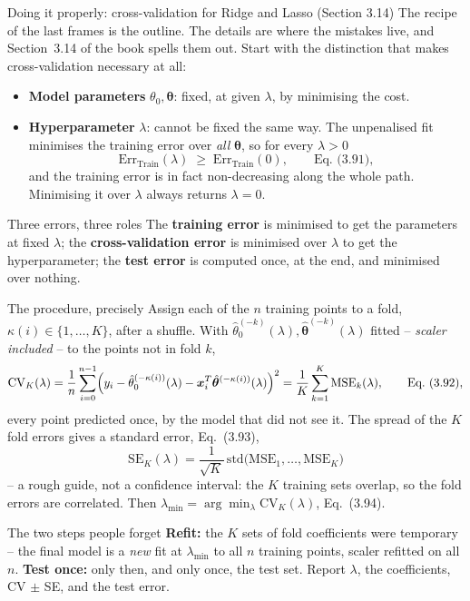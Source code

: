 \documentclass[10pt,aspectratio=169]{beamer}
\begin{document}
\begin{frame}{Doing it properly: cross-validation for Ridge and Lasso (Section 3.14)}
The recipe of the last frames is the outline.  The details are where the
mistakes live, and Section~3.14 of the book spells them out.  Start with the
distinction that makes cross-validation necessary at all:
\begin{itemize}
  \item \textbf{Model parameters} $\theta_0,\bm{\theta}$: fixed, at given
        $\lambda$, by minimising the cost.
  \item \textbf{Hyperparameter} $\lambda$: cannot be fixed the same way.  The
        unpenalised fit minimises the training error over \emph{all}
        $\bm{\theta}$, so for every $\lambda>0$
        \[
          \mathrm{Err}_{\mathrm{Train}}(\lambda)\;\ge\;\mathrm{Err}_{\mathrm{Train}}(0),
          \qquad\text{Eq.~(3.91)},
        \]
        and the training error is in fact non-decreasing along the whole
        path.  Minimising it over $\lambda$ always returns $\lambda=0$.
\end{itemize}
\vspace{2pt}
\begin{block}{Three errors, three roles}
The \textbf{training error} is minimised to get the parameters at fixed
$\lambda$; the \textbf{cross-validation error} is minimised over $\lambda$
to get the hyperparameter; the \textbf{test error} is computed once, at the
end, and minimised over nothing.
\end{block}
\end{frame}

\begin{frame}{The procedure, precisely}
Assign each of the $n$ training points to a fold, $\kappa(i)\in\{1,\dots,K\}$,
after a shuffle.  With $\hat{\theta}_0^{(-k)}(\lambda),\hat{\bm{\theta}}^{(-k)}(\lambda)$
fitted -- \emph{scaler included} -- to the points not in fold $k$,
\[
  \mathrm{CV}_K(\lambda)
   = \frac{1}{n}\sum_{i=0}^{n-1}
     \Bigl(y_i-\hat{\theta}_0^{(-\kappa(i))}(\lambda)
       -\bm{x}_i^T\hat{\bm{\theta}}^{(-\kappa(i))}(\lambda)\Bigr)^2
   = \frac{1}{K}\sum_{k=1}^{K}\mathrm{MSE}_k(\lambda),
  \qquad\text{Eq.~(3.92)},
\]
every point predicted once, by the model that did not see it.  The spread of
the $K$ fold errors gives a standard error, Eq.~(3.93),
\[
  \mathrm{SE}_K(\lambda)=\frac{1}{\sqrt{K}}\,\mathrm{std}\bigl(\mathrm{MSE}_1,\dots,\mathrm{MSE}_K\bigr)
\]
-- a rough guide, not a confidence interval: the $K$ training sets overlap,
so the fold errors are correlated.  Then
$\lambda_{\min}=\arg\min_\lambda\mathrm{CV}_K(\lambda)$, Eq.~(3.94).
\vspace{2pt}
\begin{block}{The two steps people forget}
\textbf{Refit:} the $K$ sets of fold coefficients were temporary -- the final
model is a \emph{new} fit at $\lambda_{\min}$ to all $n$ training points,
scaler refitted on all $n$.  \textbf{Test once:} only then, and only once, the
test set.  Report $\lambda$, the coefficients, CV $\pm$ SE, and the test error.
\end{block}
\end{frame}
\end{document}
